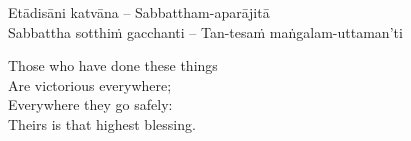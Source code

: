 Etādisāni katvāna – Sabbattham-aparājitā\\
Sabbattha sotthiṁ gacchanti – Tan-tesaṁ maṅgalam-uttaman’ti

\begin{english}
  Those who have done these things\\
  Are victorious everywhere;\\
  Everywhere they go safely:\\
  Theirs is that highest blessing.
\end{english}
\suttaRef{[Snp 2.4]}

\label{ratana-sutta}






